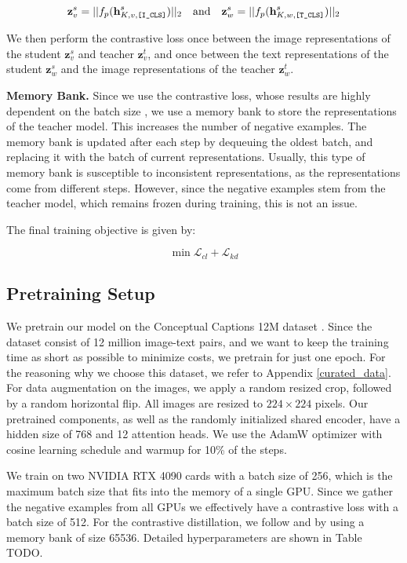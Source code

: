 \documentclass[10pt]{article} %
\begin{document}
\[
\textbf{z}^{s}_{v} = ||f_{p}(\textbf{h}^{s}_{K, v, \text{\texttt{[I\_CLS]}}})||_2 \quad \text{and} \quad \textbf{z}^{s}_{w} = ||f_{p}(\textbf{h}^{s}_{K, w, \text{\texttt{[T\_CLS]}}})||_2
\]

We then perform the contrastive loss once between the image representations of the student $\textbf{z}^{s}_{v}$ and teacher $\textbf{z}^{t}_{v}$,
and once between the text representations of the student $\textbf{z}^{s}_{w}$ and the image representations of the teacher $\textbf{z}^{t}_{w}$.


\textbf{Memory Bank.} Since we use the contrastive loss, whose results are highly dependent on the batch size \citep{moco},
we use a memory bank to store the representations of the teacher model. This increases the number of negative examples.
The memory bank is updated after each step by
dequeuing the oldest batch, and replacing it with the batch of current representations. Usually, this type of memory bank is
susceptible to inconsistent representations, as the representations come from different steps. However, since the negative examples
stem from the teacher model, which remains frozen during training, this is not an issue.

The final training objective is given by:

\[
\min \mathcal{L}_{cl} + \mathcal{L}_{kd}
\]

\subsection{Pretraining Setup}
We pretrain our model on the Conceptual Captions 12M dataset \citep{cc12m}. Since the dataset consist of 12 million image-text pairs,
and we want to keep the training time as short as possible to minimize costs, we pretrain for just one epoch.
For the reasoning why we choose this dataset, we refer to Appendix \ref{curated_data}.
For data augmentation on the images, we apply
a random resized crop, followed by a random horizontal flip. All images are resized to $224\times 224$ pixels. Our pretrained
components, as well as the randomly initialized shared encoder, have a hidden size of 768 and 12 attention heads. We use the AdamW
optimizer with cosine learning schedule and warmup for 10\% of the steps.

We train on two NVIDIA RTX 4090 cards with a batch size of 256, which is the maximum batch size that fits into the memory of a single GPU.
Since we gather the negative examples from all GPUs we effectively have a contrastive loss with a batch size of 512. For the contrastive
distillation, we follow \citet{moco} and \citet{albef} by using a memory bank of size 65536.
Detailed hyperparameters are shown in Table TODO.
\end{document}

